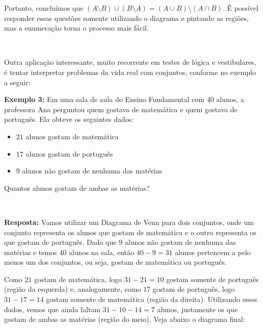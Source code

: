   Portanto, concluímos que $(A \setminus B) \cup (B \setminus A) = (A \cup B) \setminus (A \cap B)$.
  \newline
  É possível responder essas questões somente utilizando o diagrama e pintando as regiões, mas a enumeração torna o processo mais fácil.

  $\qquad$

  Outra aplicação interessante, muito recorrente em testes de lógica e vestibulares, é tentar interpretar problemas da vida real com conjuntos, conforme no exemplo a seguir:

  \textbf{Exemplo 3:} Em uma sala de aula do Ensino Fundamental com $40$ alunos, a professora Ana perguntou quem gostava de matemática e quem gostava de português. Ela obteve os seguintes dados:

  \begin{itemize}
    \item $21$ alunos gostam de matemática
    \item $17$ alunos gostam de português
    \item $9$ alunos não gostam de nenhuma das matérias
  \end{itemize}

  Quantos alunos gostam de ambas as matérias?

$\qquad$

  \textbf{Resposta:} Vamos utilizar um Diagrama de Venn para dois conjuntos, onde um conjunto representa os alunos que gostam de matemática e o outro representa os que gostam de português.
  Dado que $9$ alunos não gostam de nenhuma das matérias e temos $40$ alunos na sala, então $40-9=31$ alunos pertencem a pelo menos um dos conjuntos, ou seja, gostam de matemática ou português.

  Como $21$ gostam de matemática, logo $31-21=10$ gostam somente de português (região da esquerda) e, analogamente, como $17$ gostam de português, logo $31-17=14$ gostam somente de matemática (região da direita). Utilizando esses dados, vemos que ainda faltam $31-10-14=7$ alunos, justamente os que gostam de ambas as matérias (região do meio). Veja abaixo o diagrama final:


  $\qquad$

